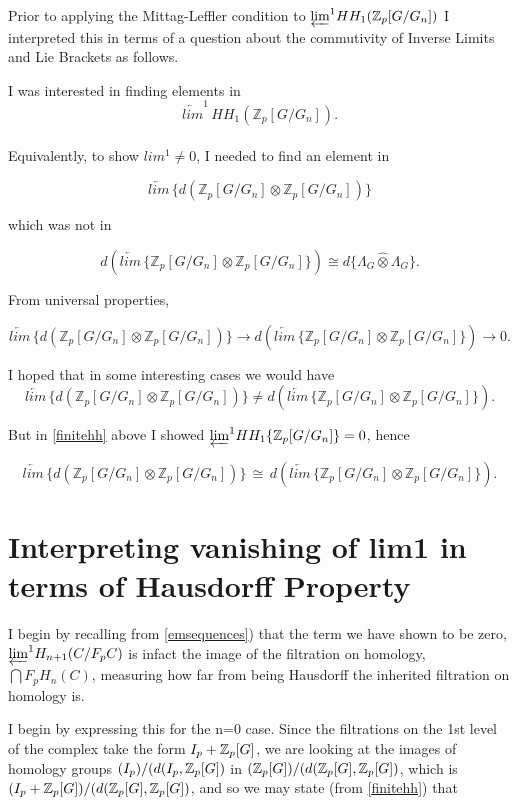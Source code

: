 Prior to applying the Mittag-Leffler condition to ${\varprojlim}^1 HH_1(\mathbb Z_p [G/G_n])$ I interpreted this in terms of a question about the commutivity of Inverse Limits and Lie Brackets as follows.  

I was interested in finding elements in 
$$\underleftarrow{lim}^1 \, HH_1(\mathbb{Z} _p [G/G_n]).$$
\\
Equivalently, to show $lim^1 \neq 0$, I needed to find an element in

$$\underleftarrow{lim} \,\{d (  \mathbb{Z}_p [G/G_n] \otimes
\mathbb{Z}_p{[G/G_n]} ) \} $$

which was not in

$$d ( \underleftarrow{lim} \,  \{\mathbb{Z}_p{[G/G_n]} \otimes
\mathbb{Z}_p{[G/G_n]} \}) \cong  d \{ \Lambda_G \widehat{\otimes} \Lambda_G \}.$$

From universal properties, 

$$\underleftarrow{lim} \,\{d (  \mathbb{Z}_p{[G/G_n]} \otimes
\mathbb{Z}_p{[G/G_n]} ) \} \rightarrow d ( \underleftarrow{lim} \,
\{\mathbb{Z}_p{[G/G_n]} \otimes
\mathbb{Z}_p{[G/G_n]} \})\rightarrow 0.$$

I hoped that in some interesting cases we would have
$$\underleftarrow{lim} \,\{d (  \mathbb{Z}_p{[G/G_n]} \otimes
\mathbb{Z}_p{[G/G_n]} ) \} \neq d ( \underleftarrow{lim} \,
\{\mathbb{Z}_p{[G/G_n]} \otimes
\mathbb{Z}_p{[G/G_n]} \}).$$

But in \ref{finitehh} above I showed ${\varprojlim}^1 HH_1 \{\mathbb Z_p [G/G_n]\} =0$, hence

$$\underleftarrow{lim} \,\{d (  \mathbb{Z}_p{[G/G_n]} \otimes
\mathbb{Z}_p{[G/G_n]} ) \} \,\cong\, d ( \underleftarrow{lim} \,
\{\mathbb{Z}_p{[G/G_n]} \otimes
\mathbb{Z}_p{[G/G_n]} \}).$$


\section{Interpreting vanishing of lim1 in terms of Hausdorff Property}
I begin by recalling from \ref{emsequences}) that the term we have shown to be zero, ${\varprojlim}^1 H_{n+1}(C/F_pC)$ is infact the image of the filtration on homology, $\bigcap F_pH_n(C)$, measuring how far from being Hausdorff the inherited filtration on homology is.

I begin by expressing this for the n=0 case. Since the filtrations on the 1st level of the complex take the form $I_p + \mathbb Z_p[G]$, we are looking at the images of homology groups $(I_p )/(d(I_p,\mathbb Z_p[G])$ in $(\mathbb Z_p[G])/(d(\mathbb Z_p[G],\mathbb Z_p[G])$, which is $(I_p+\mathbb Z_p[G])/(d(\mathbb Z_p[G],\mathbb Z_p[G])$, and so we may state (from \ref{finitehh}) that 

